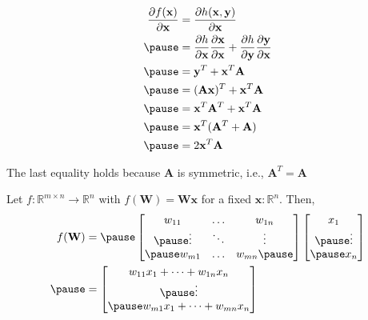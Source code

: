 \documentclass[12pt,aspectratio=169]{beamer}
\renewcommand{\Re}{\mathbb{R}}
\begin{document}
\begin{frame}
 
 $$\begin{aligned}
 \frac{\partial f(\mathbf{x})}{\partial \mathbf{x}}&=\frac{\partial h(\mathbf{x},\mathbf{y})}{\partial \mathbf{x}}\\ \pause
 &=\frac{\partial h}{\partial \mathbf{x}}\frac{\partial \mathbf{x}}{\partial \mathbf{x}}+\frac{\partial h}{\partial \mathbf{y}}\frac{\partial \mathbf{y}}{\partial \mathbf{x}}\\ \pause
 &=\mathbf{y}^T+\mathbf{x}^T\mathbf{A}\\ \pause
 &=(\mathbf{A}\mathbf{x})^T+\mathbf{x}^T\mathbf{A}\\ \pause
 &=\mathbf{x}^T\mathbf{A}^T+\mathbf{x}^T\mathbf{A}\\ \pause
 &=\mathbf{x}^T(\mathbf{A}^T+\mathbf{A})\\ \pause
 &=2\mathbf{x}^T\mathbf{A}
 \end{aligned}$$
 
 The last equality holds because $\mathbf{A}$ is symmetric, i.e., $\mathbf{A}^T=\mathbf{A}$
\end{frame}





\begin{frame}
Let $f:\Re^{m\times n}\to \Re^n$ with $f(\mathbf{W})=\mathbf{W}\mathbf{x}$ for a fixed $\mathbf{x}:\Re^n$. Then,
\[
\begin{aligned}
f(\mathbf{W})&=\pause\begin{bmatrix}
w_{11} & \dots & w_{1n}\\ \pause
\vdots & \ddots & \vdots\\ \pause
w_{m1} & \dots & w_{mn} \pause
\end{bmatrix}
\begin{bmatrix}
x_1\\ \pause
\vdots\\ \pause
x_n 
\end{bmatrix}\\ \pause
&=\begin{bmatrix}
w_{11}x_1+\dots + w_{1n}x_n\\ \pause
\vdots\\ \pause
w_{m1}x_1+\dots+w_{mn}x_n
\end{bmatrix}
\end{aligned}
\]
\end{frame}
\end{document}
